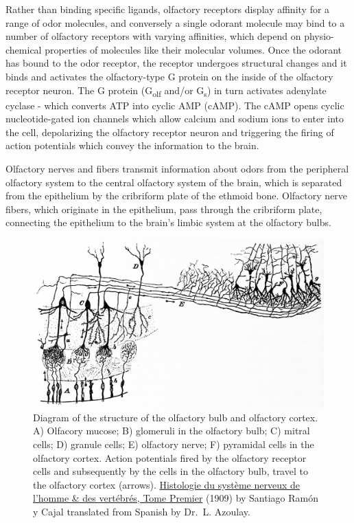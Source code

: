 Rather than binding specific ligands, olfactory receptors display affinity for a range of odor molecules, and conversely a single odorant molecule may bind to a number of olfactory receptors with varying affinities, which depend on physio-chemical properties of molecules like their molecular volumes. Once the odorant has bound to the odor receptor, the receptor undergoes structural changes and it binds and activates the olfactory-type G protein on the inside of the olfactory receptor neuron. The G protein (G\textsubscript{olf} and/or G\textsubscript{s}) in turn activates adenylate cyclase - which converts ATP into cyclic AMP (cAMP). The cAMP opens cyclic nucleotide-gated ion channels which allow calcium and sodium ions to enter into the cell, depolarizing the olfactory receptor neuron and triggering the firing of action potentials which convey the information to the brain.

Olfactory nerves and fibers transmit information about odors from the peripheral olfactory system to the central olfactory system of the brain, which is separated from the epithelium by the cribriform plate of the ethmoid bone. Olfactory nerve fibers, which originate in the epithelium, pass through the cribriform plate, connecting the epithelium to the brain's limbic system at the olfactory bulbs.



\begin{figure}

{\centering \includegraphics[width=0.7\linewidth]{./figures/olfactory/CajalOlfactoryPathway} 

}

\caption{Diagram of the structure of the olfactory bulb and olfactory cortex. A) Olfacory mucose; B) glomeruli in the olfactory bulb; C) mitral cells; D) granule cells; E) olfactory nerve; F) pyramidal cells in the olfactory cortex. Action potentials fired by the olfactory receptor cells and subsequently by the cells in the olfactory bulb, travel to the olfactory cortex (arrows). \href{https://wellcomelibrary.org/item/b2129592x\#?c=0\&m=0\&s=0\&cv=14\&z=0\%2C-3.48\%2C1\%2C8.6591}{Histologie du système nerveux de l'homme \& des vertébrés, Tome Premier} (1909) by Santiago Ramón y Cajal translated from Spanish by Dr.~L. Azoulay.}\label{fig:olfactory}
\end{figure}

